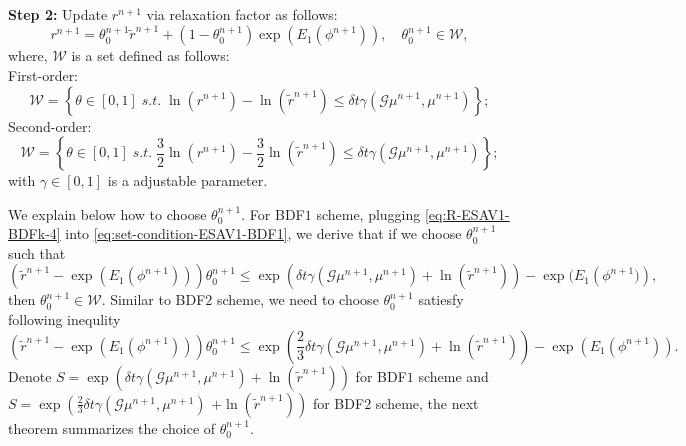 \documentclass[final,review,onefignum,onetabnum]{siamart190516}
\theoremstyle{plain}
\begin{document}
\textbf{Step 2:} Update $r^{n+1}$ via relaxation factor as follows: 
\begin{equation}\label{eq:R-ESAV1-BDFk-4}
	r^{n+1} = \theta_{0}^{n+1} \tilde{r}^{n+1} + (1-\theta_{0}^{n+1})\exp\left(E_{1}(\phi^{n+1})\right), \quad \theta_{0}^{n+1} \in \mathcal{W},
\end{equation}
where, $\mathcal{W}$ is a set defined as follows: \\
First-order:
\begin{equation}\label{eq:set-condition-ESAV1-BDF1}
	\mathcal{W}=\left\lbrace \theta\in [0,1] \; s.t. \; \ln(r^{n+1}) - \ln(\tilde r^{n+1}) \leq \delta t \gamma \left(\mathcal{G} \mu^{n+1}, \mu^{n+1}\right) \right\rbrace;
\end{equation}
Second-order:
\begin{equation}\label{eq:set-condition-ESAV1-BDF2}
	\mathcal{W}=\left\lbrace \theta\in [0,1] \; s.t. \;  \frac{3}{2}\ln(r^{n+1}) - \frac{3}{2}\ln(\tilde r^{n+1}) \leq \delta t \gamma \left(\mathcal{G} \mu^{n+1}, \mu^{n+1}\right) \right\rbrace;
\end{equation}
with $\gamma \in [0, 1]$ is a adjustable parameter. 

We explain below how to choose   $\theta_{0}^{n+1}$. 
For BDF$1$ scheme, plugging \eqref{eq:R-ESAV1-BDFk-4} into \eqref{eq:set-condition-ESAV1-BDF1}, we derive that if we choose  $\theta_0^{n+1}$ such that
\begin{equation}\label{eq:ESAV1-cond_zeta-BDF1}
\left(\tilde{r}^{n+1}-\exp\left(E_{1}\left(\phi^{n+1}\right)\right)\right)\theta_0^{n+1} \leq \exp \left(\delta t \gamma \left(\mathcal{G} \mu^{n+1}, \mu^{n+1}\right) + \ln(\tilde{r}^{n+1})\right)-\exp(E_{1}\left(\phi^{n+1})\right),
\end{equation}
then $\theta_0^{n+1}\in \mathcal{W}$. 
Similar to BDF$2$ scheme, we need to choose  $\theta_0^{n+1}$ satiesfy following inequlity  
\begin{equation}\label{eq:ESAV1-cond_zeta-BDF2}
\left(\tilde{r}^{n+1}-\exp\left(E_{1}\left(\phi^{n+1}\right)\right)\right)\theta_0^{n+1} \leq \exp \left(\frac{2}{3}\delta t \gamma \left(\mathcal{G} \mu^{n+1}, \mu^{n+1}\right) + \ln(\tilde{r}^{n+1})\right)-\exp\left(E_{1}(\phi^{n+1})\right).
\end{equation} 
Denote $S=\exp \left(\delta t \gamma \left(\mathcal{G} \mu^{n+1}, \mu^{n+1}\right) + \ln(\tilde{r}^{n+1})\right)$ for BDF$1$ scheme and $S=\exp \left(\frac{2}{3}\delta t \gamma \left(\mathcal{G} \mu^{n+1}, \mu^{n+1}\right)\right.$ $\left. + \ln(\tilde{r}^{n+1})\right)$ for BDF$2$ scheme, the next theorem summarizes the choice of $\theta_0^{n+1}$.
\end{document}
